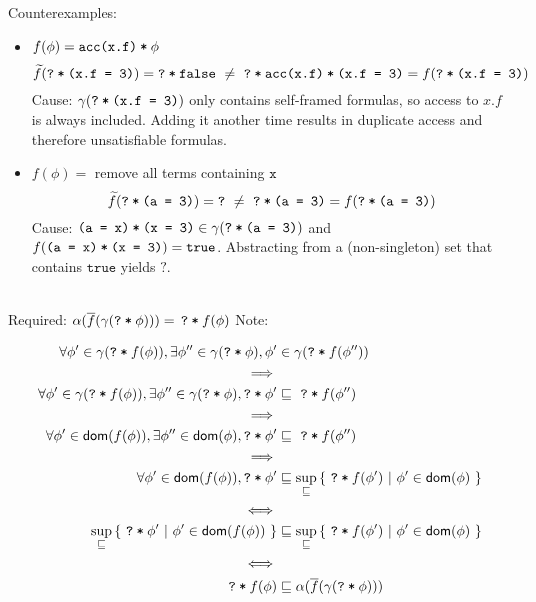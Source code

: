 \documentclass[11pt,a4paper]{article}
\newcommand{\ttt}{\texttt}
\newcommand{\predicate}{\textsf}
\newcommand{\edot}[2]{\ttt{#1.#2}}
\newcommand{\phiCons}[2]{\ttt{#1\:*\:#2}}
\newcommand{\phiFalse}[0]{\ttt{false}}
\newcommand{\phiTrue}[0]{\ttt{true}}
\newcommand{\phiEq}[2]{\ttt{(#1 = #2)}}
\newcommand{\phiAcc}[2]{\ttt{acc(#1.#2)}}
\newcommand{\dom}{\predicate{dom}}
\newcommand{\grad}[1]{\widetilde{#1}}
\newcommand{\qm}{\ttt{?}}
\newcommand{\withqm}[1]{\ttt{\qm\:*\:$#1$}}
\begin{document}
Counterexamples:
\begin{itemize}
\item $f(\phi) = \phiCons{\phiAcc {x} {f}}{$\phi$}$ \\
    \begin{equation*}
    \grad{f}(\withqm{\phiEq{\edot{x}{f}}{3}}) = \withqm{\phiFalse} 
    ~\neq~
    \withqm{\phiCons{\phiAcc {x} {f}} {\phiEq{\edot{x}{f}}{3}}} = f(\withqm{\phiEq{\edot{x}{f}}{3}})
    \end{equation*}
    Cause: $\gamma(\withqm{\phiEq{\edot{x}{f}}{3}})$ only contains self-framed formulas, so access to $x.f$ is always included. Adding it another time results in duplicate access and therefore unsatisfiable formulas.
\item $f(\phi) = $ remove all terms containing $\ttt{x}$ \\
    \begin{equation*}
    \grad{f}(\withqm{\phiEq{a}{3}}) = \qm 
    ~\neq~
    \withqm{\phiEq{a}{3}} = f(\withqm{\phiEq{a}{3}})
    \end{equation*}
    Cause: $\phiCons{\phiEq{a}{x}}{\phiEq{x}{3}} \in \gamma(\withqm{\phiEq{a}{3}})$ and $f(\phiCons{\phiEq{a}{x}}{\phiEq{x}{3}}) = \phiTrue$.
    Abstracting from a (non-singleton) set that contains $\phiTrue$ yields $\qm$.
\end{itemize}

~\\
Required: $\alpha(\overline{f}(\gamma(\withqm{\phi}))) =\, \withqm{f(\phi)}$
Note: 

\begin{align*}
\forall \phi' \in \gamma(\withqm{f(\phi)}), \exists \phi'' \in \gamma(\withqm{\phi}), \phi' &\in \gamma(\withqm{f(\phi'')}) \\
\implies \\
\forall \phi' \in \gamma(\withqm{f(\phi)}), \exists \phi'' \in \gamma(\withqm{\phi}), \withqm{\phi'} &\sqsubseteq \,\,\withqm{f(\phi'')} \\
\implies \\
\forall \phi' \in \dom(f(\phi)), \exists \phi'' \in \dom(\phi), \withqm{\phi'} &\sqsubseteq \,\,\withqm{f(\phi'')} \\
\implies \\
\forall \phi' \in \dom(f(\phi)), \withqm{\phi'} &\sqsubseteq \sup_{\sqsubseteq} {\{~ \withqm{f(\phi')} ~|~ \phi' \in \dom(\phi) ~\}} \\
\iff \\
\sup_{\sqsubseteq} {\{~ \withqm{\phi'} ~|~ \phi' \in \dom(f(\phi)) ~\}} &\sqsubseteq \sup_{\sqsubseteq} {\{~ \withqm{f(\phi')} ~|~ \phi' \in \dom(\phi) ~\}} \\
\iff \\
\withqm{f(\phi)}  &\sqsubseteq \alpha(\overline{f}(\gamma(\withqm{\phi})))
\end{align*}
\end{document}
